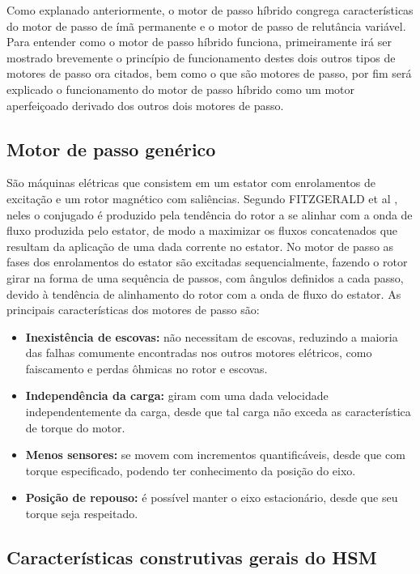Como explanado anteriormente, o motor de passo híbrido congrega características do motor de passo de ímã permanente e o motor de passo de relutância variável. Para entender como o motor de passo híbrido funciona, primeiramente irá ser mostrado brevemente o princípio de funcionamento destes dois outros tipos de motores de passo ora citados, bem como o que são motores de passo, por fim será explicado o funcionamento do motor de passo híbrido como um motor aperfeiçoado derivado dos outros dois motores de passo.  

	\subsection{Motor de passo genérico}
	São máquinas elétricas que consistem em um estator com enrolamentos de excitação e um rotor magnético com saliências. Segundo FITZGERALD et al \cite{Fitz}, neles o conjugado é produzido pela tendência do rotor a se alinhar com a onda de fluxo produzida pelo estator, de modo a maximizar os fluxos concatenados que resultam da aplicação de uma dada corrente no estator. No motor de passo as fases dos enrolamentos do estator são excitadas sequencialmente, fazendo o rotor girar na forma de uma sequência de passos, com ângulos definidos a cada passo, devido à tendência de alinhamento do rotor com a onda de fluxo do estator. \cite{Fitz} As principais características dos motores de passo são: \cite{MoonsHSM}
	
	\begin{itemize}
		\item \textbf{Inexistência de escovas:} não necessitam de escovas, reduzindo a maioria das falhas comumente encontradas nos outros motores elétricos, como faiscamento e perdas ôhmicas no rotor e escovas.
		\item \textbf{Independência da carga:} giram com uma dada velocidade independentemente da carga, desde que tal carga não exceda as característica de torque do motor.
		\item \textbf{Menos sensores:} se movem com incrementos quantificáveis, desde que com torque especificado, podendo ter conhecimento da posição do eixo.
		\item \textbf{Posição de repouso:} é possível manter o eixo estacionário, desde que seu torque seja respeitado. 
	\end{itemize}
	
	\subsection{Características construtivas gerais do HSM}
	
